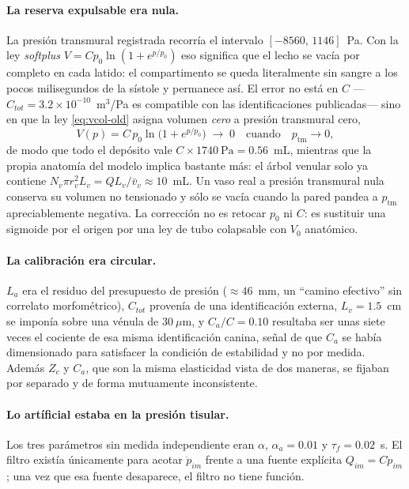 \documentclass[11pt]{article}
\newcommand{\ptm}{p_{\mathrm{tm}}}
\begin{document}
\paragraph{La reserva expulsable era nula.} La presi\'on transmural registrada
recorr\'ia el intervalo $[-8560,\,1146]$~Pa. Con la ley \emph{softplus}
$V=Cp_0\ln(1+e^{p/p_0})$ eso significa que el lecho se vac\'ia por completo en
cada latido: el compartimento se queda literalmente sin sangre a los pocos
milisegundos de la s\'istole y permanece as\'i. El error no est\'a en $C$
---$C_{tot}=3.2\times10^{-10}$~m$^3$/Pa es compatible con las
identificaciones publicadas--- sino en que la ley \eqref{eq:vcol-old} asigna
volumen \emph{cero} a presi\'on transmural cero,
\begin{equation}
  V(p)=C\,p_0\ln\bigl(1+e^{p/p_0}\bigr)\;\longrightarrow\;0
  \quad\text{cuando}\quad \ptm\to0 ,
  \label{eq:vcol-old}
\end{equation}
de modo que todo el dep\'osito vale $C\times1740~\text{Pa}=0.56$~mL, mientras
que la propia anatom\'ia del modelo implica bastante m\'as: el \'arbol venular
solo ya contiene $N_v\pi r_v^2L_v=QL_v/\bar v_v\approx10$~mL. Un vaso real a
presi\'on transmural nula conserva su volumen no tensionado y s\'olo se vac\'ia
cuando la pared pandea a $\ptm$ apreciablemente negativa. La correcci\'on no es
retocar $p_0$ ni $C$: es sustituir una sigmoide por el origen por una ley de
tubo colapsable con $V_0$ anat\'omico.

\paragraph{La calibraci\'on era circular.} $L_a$ era el residuo del presupuesto
de presi\'on ($\approx46$~mm, un ``camino efectivo'' sin correlato
morfom\'etrico), $C_{tot}$ proven\'ia de una identificaci\'on externa,
$L_v=1.5$~cm se impon\'ia sobre una v\'enula de $30~\mu$m, y $C_a/C=0.10$
resultaba ser unas siete veces el cociente de esa misma identificaci\'on
canina, se\~nal de que $C_a$ se hab\'ia dimensionado para satisfacer la
condici\'on de estabilidad y no por medida. Adem\'as $Z_c$ y $C_a$, que son la
misma elasticidad vista de dos maneras, se fijaban por separado y de forma
mutuamente inconsistente.

\paragraph{Lo art\'ificial estaba en la presi\'on tisular.} Los tres
par\'ametros sin medida independiente eran $\alpha$, $\alpha_a=0.01$ y
$\tau_f=0.02$~s. El filtro exist\'ia \'unicamente para acotar $\dot p_{im}$
frente a una fuente expl\'icita $Q_{im}=C\dot p_{im}$; una vez que esa fuente
desaparece, el filtro no tiene funci\'on.
\end{document}
